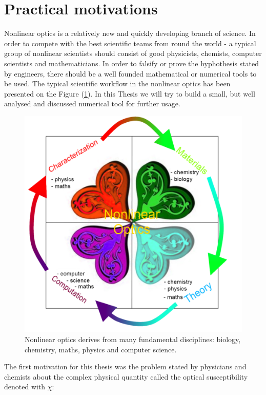 \documentclass[12pt,twoside,a4paper]{article}
\def\emptyline{\vspace{12pt}}
\numberwithin{equation}{subsection}
\numberwithin{figure}{subsection}
\begin{document}
\emptyline

\section{Practical motivations} \label{chap:practical_motivations}
Nonlinear optics is a relatively new and quickly developing branch of science. In order to compete with the best scientific teams from round the world - a typical group of nonlinear scientists should consist of good physicists, chemists, computer scientists and mathematicians. In order to falsify or prove the hyphothesis stated by engineers, there should be a well founded mathematical or numerical tools to be used. The typical scientific workflow in the nonlinear optics has been presented on the Figure (\ref{fig:practical_nlo}). In this Thesis we will try to build a small, but well analysed and discussed numerical tool for further usage.


\begin{figure} 
 \includegraphics{img/nlo.png}
 \caption{Nonlinear optics derives from many fundamental disciplines: biology, chemistry, maths, physics and computer science. \label{fig:practical_nlo}}
\end{figure}


The first motivation for this thesis was the problem stated by physicians and chemists about the complex physical quantity called the optical susceptibility denoted with $\chi$:
\end{document}
